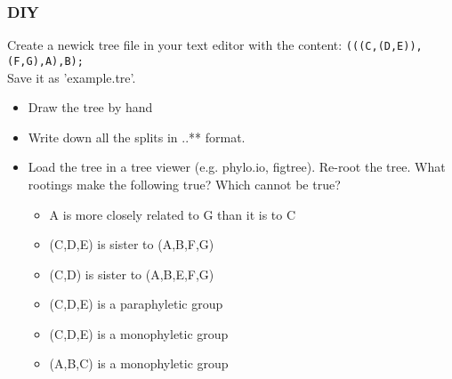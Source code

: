\documentclass{beamer}
\begin{document}
\begin{frame}
\frametitle{DIY}
Create a newick tree file in your text editor with the content:
\texttt{(((C,(D,E)),(F,G),A),B);}\\
Save it as 'example.tre'.\\
\begin{itemize}
 \item Draw the tree by hand
 \item Write down all the splits in ..** format.
 \item Load the tree in a tree viewer (e.g. phylo.io, figtree). Re-root  the tree. What rootings make the following true? Which cannot be true?
 \begin{itemize}
 \item A is more closely related to G than it is to C
 \item (C,D,E) is sister to (A,B,F,G)
 \item (C,D) is sister to (A,B,E,F,G)
 \item (C,D,E) is a paraphyletic group
 \item (C,D,E) is a monophyletic group
 \item (A,B,C) is a monophyletic group
 \end{itemize}
\end{itemize}
\end{frame}
\end{document}
